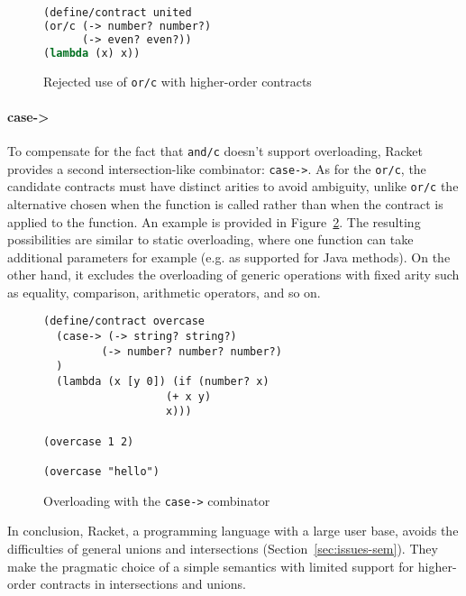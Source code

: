 \documentclass[sigplan,10pt,review,anonymous]{acmart}
\newcommand{\unsure}[2][1=]{}
\newcommand{\racket}[1]{\lstinline[language=racket]{#1}}
\begin{document}
\begin{figure}[h]

\begin{lstlisting}[language=lisp]
(define/contract united
(or/c (-> number? number?)
      (-> even? even?))
(lambda (x) x))
\end{lstlisting}
\caption{Rejected use of \racket{or/c} with higher-order contracts}
\label{code:racket:or/c:non-working}

\end{figure}


\unsure{This section is overall a bit hard to follow. I
  think I've figured out what it means, but it needs more love. Also
  give an example which doesn't work and one that does for or/c.}

\paragraph{case->}

To compensate for the fact that \racket{and/c} doesn't support
overloading,
Racket provides a second intersection-like combinator: \racket{case->}. As for the \racket{or/c}, the candidate contracts must have
distinct arities to avoid ambiguity, unlike \racket{or/c} the
alternative chosen when the function is called rather than when the
contract is applied to the function. An example is provided in
Figure~\ref{fig:racket-case-fun}. The resulting possibilities are similar
to static overloading, where one function can take additional parameters for
example (e.g. as supported for Java methods). On the other hand, it excludes the
overloading of generic operations with fixed arity such as equality, comparison,
arithmetic operators, and so on.

\begin{figure}[h]
\begin{lstlisting}[language=racket]
(define/contract overcase
  (case-> (-> string? string?)
         (-> number? number? number?)
  )
  (lambda (x [y 0]) (if (number? x)
                   (+ x y)
                   x)))

(overcase 1 2)

(overcase "hello")
\end{lstlisting}
\caption{Overloading with the \racket{case->} combinator}
\label{fig:racket-case-fun}
\end{figure}

In conclusion, Racket, a programming language with a large user base,
avoids the difficulties of general unions and intersections (Section~\ref{sec:issues-sem}). They make
the pragmatic choice of a simple semantics with limited support for
higher-order contracts in intersections and unions.
\end{document}
